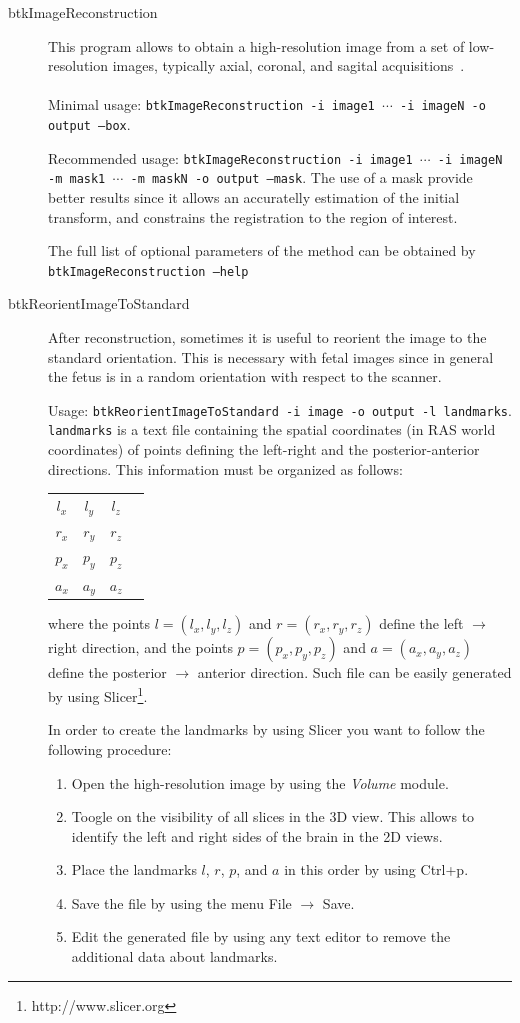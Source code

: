 \begin{description}
 \item[btkImageReconstruction] This program allows to obtain a
high-resolution image from a set of low-resolution images, typically
axial, coronal, and sagital acquisitions~\cite{Rousseau2006}. \\\\
Minimal usage: \texttt{btkImageReconstruction -i image1 $\cdots$ -i imageN -o
output --box}. 

Recommended usage: \texttt{btkImageReconstruction -i image1 $\cdots$ -i imageN
-m mask1 $\cdots$ -m maskN -o output --mask}. The use of a mask provide
better results since it allows an accuratelly estimation of the initial
transform, and constrains the registration to the region of interest.

The full list of optional parameters of the method can be obtained by
\texttt{btkImageReconstruction --help}

\item[btkReorientImageToStandard] After reconstruction, sometimes it is useful
to reorient the image to the standard orientation. This is necessary with fetal
images since in general the fetus is in a random orientation with respect to the
scanner.

Usage: \texttt{btkReorientImageToStandard -i image -o output -l landmarks}.
\texttt{landmarks} is a text file containing the spatial coordinates (in
RAS world coordinates) of points defining the left-right and the
posterior-anterior directions. This information must be organized as follows:

\begin{tabular}{cccc}
$l_x$ & $l_y$ & $l_z$ \\
$r_x$ & $r_y$ & $r_z$ \\
$p_x$ & $p_y$ & $p_z$ \\
$a_x$ & $a_y$ & $a_z$ 
\end{tabular}

where the points $l=(l_x, l_y, l_z)$ and $r=(r_x, r_y, r_z)$ define the
left $\rightarrow$ right direction, and the points $p=(p_x, p_y, p_z)$ and
$a=(a_x, a_y, a_z)$ define the posterior $\rightarrow$ anterior direction. Such
file can be easily generated by using Slicer\footnote{http://www.slicer.org}.

In order to create the landmarks by using Slicer you want to follow the
following procedure:

\begin{enumerate}
\item Open the high-resolution image by using the \textit{Volume} module.
\item Toogle on the visibility of all slices in the 3D view. This allows to
identify the left and right sides of the brain in the 2D views.
\item Place the landmarks $l$, $r$, $p$, and $a$ in this order by using
Ctrl+p.
\item Save the file by using the menu File $\rightarrow$ Save.
\item Edit the generated file by using any text editor to remove the additional
data about landmarks.
\end{enumerate}


\end{description}
